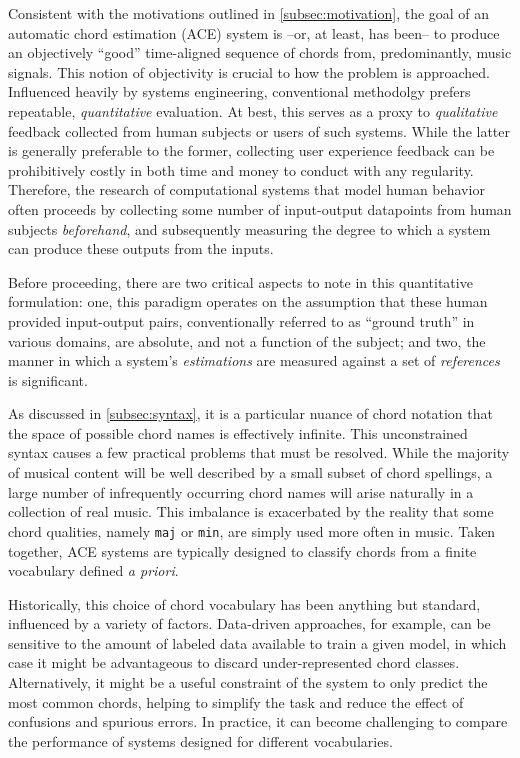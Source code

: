 Consistent with the motivations outlined in \ref{subsec:motivation}, the goal of an automatic chord estimation (ACE) system is --or, at least, has been-- to produce an objectively ``good'' time-aligned sequence of chords from, predominantly, music signals.
This notion of objectivity is crucial to how the problem is approached.
Influenced heavily by systems engineering, conventional methodolgy prefers repeatable, \emph{quantitative} evaluation.
At best, this serves as a proxy to \emph{qualitative} feedback collected from human subjects or users of such systems.
While the latter is generally preferable to the former, collecting user experience feedback can be prohibitively costly in both time and money to conduct with any regularity.
Therefore, the research of computational systems that model human behavior often proceeds by collecting some number of input-output datapoints from human subjects \emph{beforehand}, and subsequently measuring the degree to which a system can produce these outputs from the inputs.

Before proceeding, there are two critical aspects to note in this quantitative formulation:
one, this paradigm operates on the assumption that these human provided input-output pairs, conventionally referred to as ``ground truth'' in various domains, are absolute, and not a function of the subject;
and two, the manner in which a system's \emph{estimations} are measured against a set of \emph{references} is significant.

As discussed in \ref{subsec:syntax}, it is a particular nuance of chord notation that the space of possible chord names is effectively infinite.
This unconstrained syntax causes a few practical problems that must be resolved.
While the majority of musical content will be well described by a small subset of chord spellings, a large number of infrequently occurring chord names will arise naturally in a collection of real music.
This imbalance is exacerbated by the reality that some chord qualities, namely \texttt{maj} or \texttt{min}, are simply used more often in music.
Taken together, ACE systems are typically designed to classify chords from a finite vocabulary defined \emph{a priori}.

Historically, this choice of chord vocabulary has been anything but standard, influenced by a variety of factors.
Data-driven approaches, for example, can be sensitive to the amount of labeled data available to train a given model, in which case it might be advantageous to discard under-represented chord classes.
Alternatively, it might be a useful constraint of the system to only predict the most common chords, helping to simplify the task and reduce the effect of confusions and spurious errors.
In practice, it can become challenging to compare the performance of systems designed for different vocabularies.

